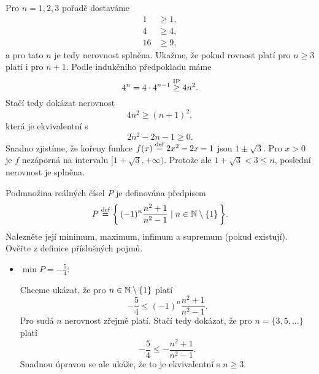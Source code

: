 \documentclass[answers]{exam}
\begin{document}
\begin{questions}
  \begin{solution}
    Pro $n = 1, 2, 3$ pořadě dostaváme
    \begin{align*}
      1 &\ge 1,
      \\
      4 &\ge 4,
      \\
      16 &\ge 9,
    \end{align*}
    a pro tato $n$ je tedy nerovnost splněna. Ukažme, že pokud rovnost platí pro $n \ge 3$ platí i pro $n + 1$. Podle indukčního předpokladu máme
    \begin{equation*}
      4^n = 4 \cdot 4^{n - 1} \stackrel{\text{IP}}{\ge} 4n^2.
    \end{equation*}
    Stačí tedy dokázat nerovnost
    \begin{equation*}
      4 n^2
      \ge
      (n + 1)^2,
    \end{equation*}
    která je ekvivalentní s
    \begin{equation*}
      2n^2 - 2n - 1 \ge 0.
    \end{equation*}
    Snadno zjistíme, že kořeny funkce $f(x) \stackrel{\text{def}}{=} 2 x^2 - 2x - 1$ jsou $1 \pm \sqrt{3}$. Pro $x > 0$ je $f$ nezáporná na intervalu $[1 + \sqrt{3}, +\infty)$. Protože ale $1 + \sqrt{3} < 3 \le n$, poslední nerovnost je splněna.
   
  \end{solution}
  
  \question[2] Podmnožina reálných čísel $P$ je definována předpisem 
  \begin{equation*}
    P \defeq \set{(-1)^n \frac{n^2 + 1}{n^2 - 1}}{n \in \N \setminus \{1\}}.
  \end{equation*}
  Nalezněte její minimum, maximum, infimum a supremum (pokud existují). Ověřte z definice příslušných pojmů.
  
  \begin{solution}   
    \begin{itemize}
      \item $\min P = - \frac{5}{4}$: 
      
        Chceme ukázat, že pro $n \in \mathbb{N} \setminus \{1\}$ platí 
        \begin{equation*}
          - \frac{5}{4}
          \le
          (-1)^n \frac{n^2 + 1}{n^2 - 1}.
        \end{equation*}
        Pro sudá $n$ nerovnost zřejmě platí. Stačí tedy dokázat, že pro $n = \{3, 5, \dots\}$ platí
        \begin{equation*}
          - \frac{5}{4}
          \le
          -
          \frac{n^2 + 1}{n^2 - 1}.
        \end{equation*}
        Snadnou úpravou se ale ukáže, že to je ekvivalentní s $n \ge 3$.
      

\end{itemize}
\end{solution}
\end{questions}
\end{document}
